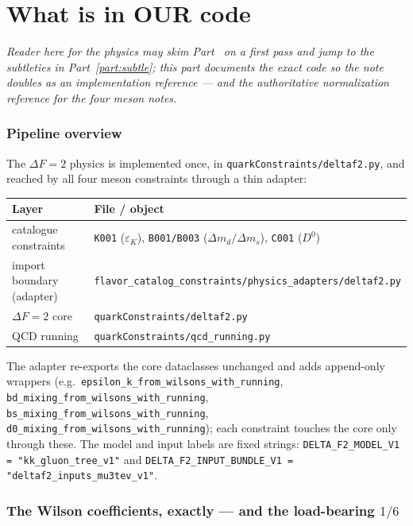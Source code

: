 \documentclass[11pt]{article}
\newcommand{\eps}{\varepsilon}
\newcommand{\code}[1]{\texttt{#1}}
\theoremstyle{definition}
\begin{document}
\part{What is in OUR code}
\label{part:code}

\emph{Reader here for the physics may skim Part~\ref{part:code} on a first pass
and jump to the subtleties in Part~\ref{part:subtle}; this part documents the
exact code so the note doubles as an implementation reference --- and the
authoritative normalization reference for the four meson notes.}

\section{Pipeline overview}
\label{sec:pipeline}

The $\Delta F=2$ physics is implemented once, in
\code{quarkConstraints/deltaf2.py}, and reached by all four meson constraints
through a thin adapter:
\begin{center}
\begin{tabular}{ll}
\toprule
Layer & File / object \\
\midrule
catalogue constraints & \code{K001} ($\eps_K$), \code{B001/B003} ($\Delta m_{d}/\Delta m_s$), \code{C001} ($D^0$) \\
import boundary (adapter) & \code{flavor\_catalog\_constraints/physics\_adapters/deltaf2.py} \\
$\Delta F=2$ core & \code{quarkConstraints/deltaf2.py} \\
QCD running & \code{quarkConstraints/qcd\_running.py} \\
\bottomrule
\end{tabular}
\end{center}
The adapter re-exports the core dataclasses unchanged and adds append-only
wrappers (e.g.\ \code{epsilon\_k\_from\_wilsons\_with\_running},
\code{bd\_mixing\_from\_wilsons\_with\_running},
\code{bs\_mixing\_from\_wilsons\_with\_running},
\code{d0\_mixing\_from\_wilsons\_with\_running}); each constraint touches the core
only through these. The model and input labels are fixed strings:
\code{DELTA\_F2\_MODEL\_V1 = "kk\_gluon\_tree\_v1"} and
\code{DELTA\_F2\_INPUT\_BUNDLE\_V1 = "deltaf2\_inputs\_mu3tev\_v1"}.

\section{The Wilson coefficients, exactly --- and the load-bearing $1/6$}
\label{sec:codeWilsons}
\end{document}

